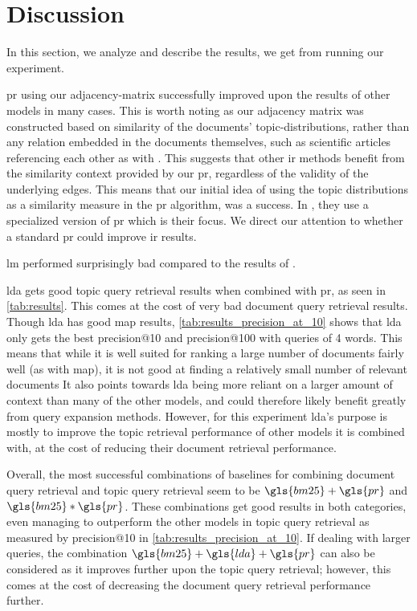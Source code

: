 \section{Discussion}\label{sec:discussion}
In this section, we analyze and describe the results, we get from running our experiment.

\gls{pr} using our adjacency-matrix successfully improved upon the results of other models in many cases.
This is worth noting as our adjacency matrix was constructed based on similarity of the documents' topic-distributions, rather than any relation embedded in the documents themselves, such as scientific articles referencing each other as with \citeauthor{yang2009topic}\cite{yang2009topic}.
This suggests that other \gls{ir} methods benefit from the similarity context provided by our \gls{pr}, regardless of the validity of the underlying edges.
This means that our initial idea of using the topic distributions as a similarity measure in the \gls{pr} algorithm, was a success.
In \cite{yang2009topic}, they use a specialized version of \gls{pr} which is their focus.
We direct our attention to whether a standard \gls{pr} could improve \gls{ir} results.

\gls{lm} performed surprisingly bad compared to the results of \cite{yang2009topic}. 

\gls{lda} gets good topic query retrieval results when combined with \gls{pr}, as seen in \autoref{tab:results}.
This comes at the cost of very bad document query retrieval results.
Though \gls{lda} has good \gls{map} results, \autoref{tab:results_precision_at_10} shows that \gls{lda} only gets the best precision@10 and precision@100 with queries of 4 words.
This means that while it is well suited for ranking a large number of documents fairly well (as with \gls{map}), it is not good at finding a relatively small number of relevant documents
It also points towards \gls{lda} being more reliant on a larger amount of context than many of the other models, and could therefore likely benefit greatly from query expansion methods.
However, for this experiment \gls{lda}'s purpose is mostly to improve the topic retrieval performance of other models it is combined with, at the cost of reducing their document retrieval performance.

Overall, the most successful combinations of baselines for combining document query retrieval and topic query retrieval seem to be $\gls{bm25}+\gls{pr}$ and $\gls{bm25}*\gls{pr}$.
These combinations get good results in both categories, even managing to outperform the other models in topic query retrieval as measured by precision@10 in \autoref{tab:results_precision_at_10}.
If dealing with larger queries, the combination $\gls{bm25}+\gls{lda}+\gls{pr}$ can also be considered as it improves further upon the topic query retrieval; however, this comes at the cost of decreasing the document query retrieval performance further.
